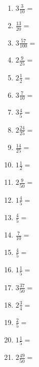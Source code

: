 \documentclass[12pt]{article}
\begin{document}
\begin{enumerate}
\item \large $ 3 \frac{3}{10} = $ \vspace{1.5cm}
\newpage
\item \large $ \frac{13}{20} = $ \vspace{1.5cm}
\item \large $ 3 \frac{57}{100} = $ \vspace{1.5cm}
\item \large $ 2 \frac{9}{25} = $ \vspace{1.5cm}
\item \large $ 2 \frac{1}{2} = $ \vspace{1.5cm}
\item \large $ 3 \frac{7}{10} = $ \vspace{1.5cm}
\item \large $ 3 \frac{4}{5} = $ \vspace{1.5cm}
\item \large $ 2 \frac{24}{25} = $ \vspace{1.5cm}
\item \large $ \frac{14}{25} = $ \vspace{1.5cm}
\item \large $ 1 \frac{1}{2} = $ \vspace{1.5cm}
\item \large $ 2 \frac{9}{50} = $ \vspace{1.5cm}
\newpage
\item \large $ 1 \frac{4}{5} = $ \vspace{1.5cm}
\item \large $ \frac{4}{5} = $ \vspace{1.5cm}
\item \large $ \frac{7}{10} = $ \vspace{1.5cm}
\item \large $ \frac{4}{5} = $ \vspace{1.5cm}
\item \large $ 1 \frac{1}{5} = $ \vspace{1.5cm}
\item \large $ 3 \frac{37}{50} = $ \vspace{1.5cm}
\item \large $ 2 \frac{3}{4} = $ \vspace{1.5cm}
\item \large $ \frac{2}{5} = $ \vspace{1.5cm}
\item \large $ 1 \frac{1}{5} = $ \vspace{1.5cm}
\item \large $ 2 \frac{49}{50} = $ \vspace{1.5cm}

\end{enumerate}
\end{document}
